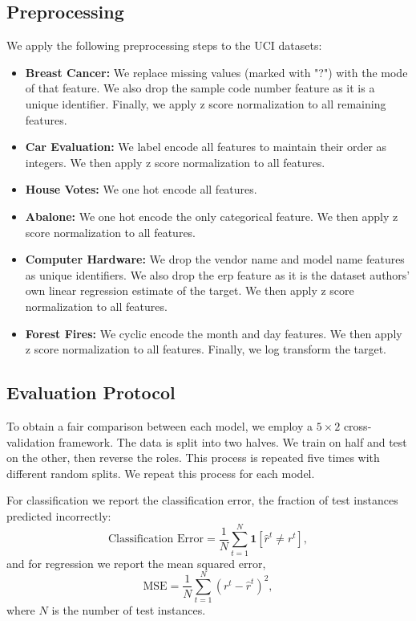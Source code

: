 \documentclass[twoside,11pt]{article}
\begin{document}
\subsection{Preprocessing}
We apply the following preprocessing steps to the UCI datasets:
\begin{itemize}
    \item \textbf{Breast Cancer:} We replace missing values (marked with "?") with the mode of that feature. We also drop the sample code number feature as it is a unique identifier. Finally, we apply z score normalization to all remaining features.
    \item \textbf{Car Evaluation:} We label encode all features to maintain their order as integers. We then apply z score normalization to all features.
    \item \textbf{House Votes:} We one hot encode all features.
    \item \textbf{Abalone:} We one hot encode the only categorical feature. We then apply z score normalization to all features.
    \item \textbf{Computer Hardware:} We drop the vendor name and model name features as unique identifiers. We also drop the erp feature as it is the dataset authors' own linear regression estimate of the target. We then apply z score normalization to all features.
    \item \textbf{Forest Fires:} We cyclic encode the month and day features. We then apply z score normalization to all features. Finally, we log transform the target.
\end{itemize}

\subsection{Evaluation Protocol}
To obtain a fair comparison between each model, we employ a $5 \times 2$ cross-validation framework. The data is split into two halves. We train on half and test on the other, then reverse the roles. This process is repeated five times with different random splits. We repeat this process for each model.

For classification we report the classification error, the fraction of test instances predicted incorrectly:
\begin{equation}
    \text{Classification Error} = \frac{1}{N}\sum_{t=1}^{N} \mathbf{1}\left[\hat{r}^t \neq r^t\right],
\end{equation}
and for regression we report the mean squared error,
\begin{equation}
    \text{MSE} = \frac{1}{N}\sum_{t=1}^{N} \left(r^t - \hat{r}^t\right)^2,
\end{equation}
where $N$ is the number of test instances.
\end{document}
